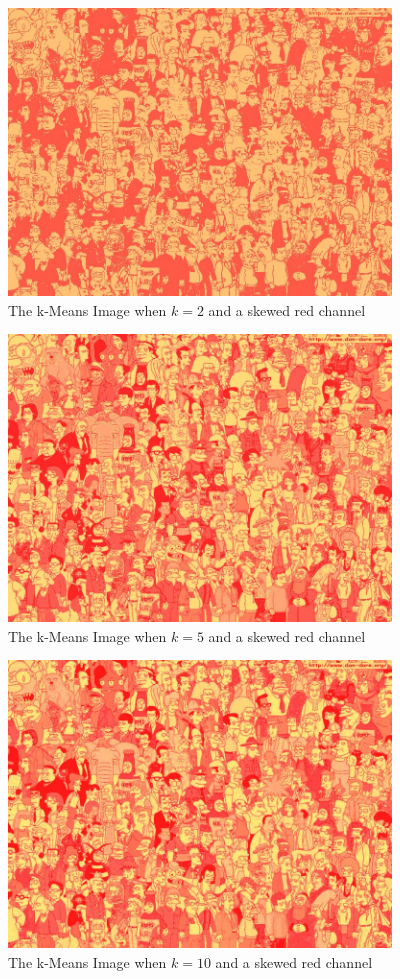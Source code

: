 \documentclass[11pt,psfig]{article}
\begin{document}
\begin{figure}[H]
\centering
\includegraphics[height=3in]{2-means_redEn_simpsons.jpg}
\caption{The k-Means Image when $k=2$ and a skewed red channel}
\end{figure}

\begin{figure}[H]
\centering
\includegraphics[height=3in]{5-means_redEn_simpsons.jpg}
\caption{The k-Means Image when $k=5$ and a skewed red channel}
\end{figure}

\begin{figure}[H]
\centering
\includegraphics[height=3in]{10-means_redEn_simpsons.jpg}
\caption{The k-Means Image when $k=10$ and a skewed red channel}
\end{figure}
\end{document}

